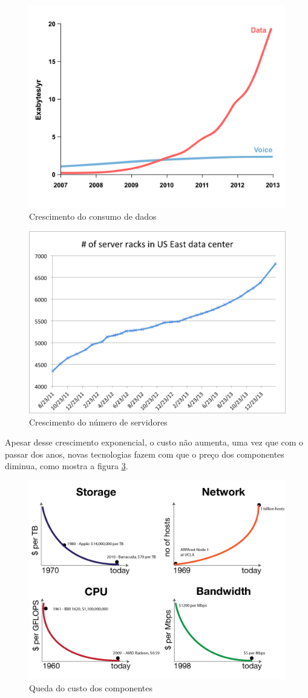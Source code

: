 \documentclass[12pt,a4paper]{report}
\begin{document}
\begin{figure}[H]
\centering
\includegraphics[width=.7\textwidth]{imagens/consumo.png}
\caption{Crescimento do consumo de dados}
\label{consumo}
\end{figure}

\begin{figure}[H]
\centering
\includegraphics[width=.7\textwidth]{imagens/servidores.png}
\caption{Crescimento do número de servidores}
\label{servidores}
\end{figure}

Apesar desse crescimento exponencial, o custo não aumenta, uma vez que com o passar dos anos, novas tecnologias fazem com que o preço dos componentes diminua, como mostra a figura \ref{custo}.\\

\begin{figure}[H]
\centering
\includegraphics[width=.7\textwidth]{imagens/custo.png}
\caption{Queda do custo dos componentes}
\label{custo}
\end{figure}
\end{document}
